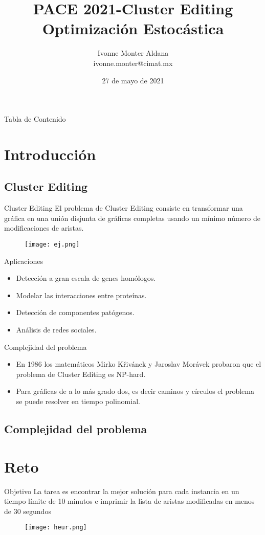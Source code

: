 \documentclass[10pt]{beamer}
\author[Ivonne] 
{Ivonne Monter Aldana\\ivonne.monter@cimat.mx}
\institute[VFU] 
{
  CIMAT
}
\title{PACE 2021-Cluster Editing\\Optimización Estocástica}{}
\date{27 de mayo de 2021}
\begin{document}
\titlepage
\begin{frame}{Tabla de Contenido}
\tableofcontents
\end{frame}
\section{Introducción}
\subsection{Cluster Editing}
\begin{frame}{Cluster Editing}
El problema de Cluster Editing consiste en transformar una gráfica en una unión disjunta de gráficas completas usando un mínimo número de modificaciones de aristas.
\begin{figure}
\texttt{[image: ej.png]}
\end{figure}
\end{frame}
\begin{frame}{Aplicaciones}
\begin{itemize}
\item Detección a gran escala de genes homólogos.
\item Modelar las interacciones entre proteínas.
\item Detección de componentes patógenos.
\item Análisis de redes sociales.
\end{itemize}
\end{frame}
\begin{frame}{Complejidad del problema}
\begin{itemize}
\item En 1986 los matemáticos Mirko Křivánek y Jaroslav Morávek probaron que el problema de Cluster Editing es NP-hard.

\item Para gráficas de a lo más grado dos, es decir caminos y círculos el problema se puede resolver en tiempo polinomial.
\end{itemize}

\end{frame}
\subsection{Complejidad del problema}
\section{Reto}
\begin{frame}{Objetivo}
La tarea es encontrar la mejor solución para cada instancia en un tiempo límite de 10 minutos e imprimir la lista de aristas modificadas en menos de 30 segundos
\begin{figure}
\texttt{[image: heur.png]}
\end{figure}
\end{frame}
\end{document}
